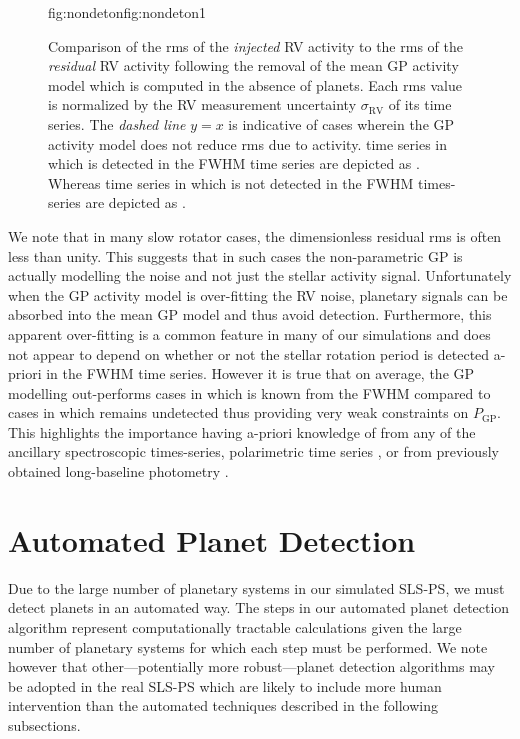 \begin{figure}
\begin{ocg}{fig:nondeton}{fig:nondeton}{1}
  \end{ocg}
  \hspace{-0.6\hsize}%
  \caption[GP activity model performance in simulated SPIRou RV timeseries.]
    {\small Comparison of the rms of the \emph{injected} RV activity to the rms of the \emph{residual} RV activity following
    the removal of the mean GP activity model which is
    computed in the absence of planets. Each rms value is normalized by the
    RV measurement uncertainty $\sigma_{\text{RV}}$ of its time series. The \emph{dashed line} $y=x$ is indicative of cases
    wherein the GP activity model does not reduce rms due to activity. time series in which \prot{} is detected in the
    FWHM time series are depicted as 
    . Whereas time series in which \prot{} is not detected in
    the FWHM times-series are depicted as .}
  \label{BSfig:compareGPres}
\end{figure}

We note that in many slow rotator cases, the dimensionless residual rms is often less than unity. This suggests that in such
cases the non-parametric GP is actually modelling the noise and not just the stellar activity signal.
Unfortunately when the GP activity model is over-fitting the RV noise, planetary signals can be absorbed into the mean GP
model and thus avoid detection. Furthermore,
this apparent over-fitting is a common feature in many of our simulations and does not appear to depend on
whether or not the stellar rotation period is detected a-priori in the FWHM time series.
However it is true that on average,
the GP modelling out-performs cases in which \prot{} is known from the FWHM compared to cases in which \prot{} remains
undetected thus providing very weak constraints on $P_{\text{GP}}$.
This highlights the importance having a-priori knowledge of \prot{} from any of the
ancillary spectroscopic times-series, polarimetric time series \citep{hebrard16},
or from previously obtained long-baseline photometry \citep[e.g.][]{newton16a}.


\section{Automated Planet Detection} \label{BSsect:detection}
Due to the large number of planetary systems in our simulated SLS-PS, we must detect planets in an automated
way. The steps in our automated planet detection algorithm
represent computationally tractable calculations given the large number of planetary systems
for which each step must be performed. We note however that other---potentially more robust---planet
detection algorithms may be adopted in the real SLS-PS which are likely to include more
human intervention than the automated techniques described in the following subsections.

